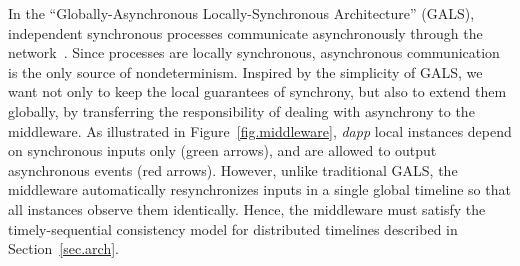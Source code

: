\documentclass[sigplan,screen]{acmart}
\newcommand{\dapp}{\emph{dapp}\xspace}
\begin{document}
In the ``Globally-Asynchronous Locally-Synchronous Architecture'' (GALS),
independent synchronous processes communicate asynchronously through the
network~\cite{gals.taxonomy}.
Since processes are locally synchronous, asynchronous communication is the only
source of nondeterminism.
%
Inspired by the simplicity of GALS, we want not only to keep the local
guarantees of synchrony, but also to extend them globally, by transferring the
responsibility of dealing with asynchrony to the middleware.
%
As illustrated in Figure~\ref{fig.middleware}, \dapp local instances depend on
synchronous inputs only (green arrows), and are allowed to output asynchronous
events (red arrows).
%
However, unlike traditional GALS, the middleware automatically resynchronizes
inputs in a single global timeline so that all instances observe them
identically.
Hence, the middleware must satisfy the timely-sequential consistency model for
distributed timelines described in Section~\ref{sec.arch}.
\end{document}
